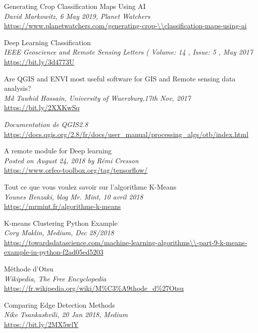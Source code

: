 \documentclass[12pt, openany]{report}
\begin{document}
\begin{thebibliography}{9}
Generating Crop Classification Maps Using AI\\
\textit{David Markowitz, 6 May 2019, Planet Watchers}\\
\url{https://www.planetwatchers.com/generating-crop-\\classification-maps-using-ai}


Deep Learning Classification\\
\textit{ IEEE Geoscience and Remote Sensing Letters ( Volume: 14 , Issue: 5 , May 2017 }\\
\url{https://bit.ly/3d4773U}

Are QGIS and ENVI most useful software for GIS and Remote sensing data analysis?\\
\textit{Md Tawhid Hossain, University of Wuerzburg,17th Nov, 2017}\\
\url{https://bit.ly/2XXKwSq}

\textit{Documentation de QGIS2.8}\\
\url{https://docs.qgis.org/2.8/fr/docs/user_manual/processing_algs/otb/index.html}

A remote module for Deep learning\\
\textit{Posted on August 24, 2018 by Rémi Cresson}\\
\url{https://www.orfeo-toolbox.org/tag/tensorflow/}

Tout ce que vous voulez savoir sur l’algorithme K-Means\\
\textit{Younes Benzaki, blog Mr. Mint,  10 avril 2018}\\
\url{https://mrmint.fr/algorithme-k-means}


K-means Clustering Python Example\\
\textit{Cory Maklin, Medium, Dec 28/2018}\\
\url{https://towardsdatascience.com/machine-learning-algorithms\\-part-9-k-means-example-in-python-f2ad05ed5203}

Méthode d'Otsu\\
\textit{{W}ikipedia{,} The Free Encyclopedia}\\
\url{https://fr.wikipedia.org/wiki/M\%C3\%A9thode_d\%27Otsu}

Comparing Edge Detection Methods\\
\textit{Nike Tsankashvili, 20 Jan 2018, Medium}\\
\url{https://bit.ly/2MX5wlY}




\end{thebibliography}
\end{document}
